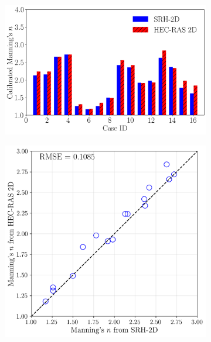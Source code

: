 \documentclass[preview, border=2pt]{standalone}
\begin{document}
\begin{figure}
     \centering
     \begin{subfigure}[c]{0.45\textwidth}
         \centering
         \caption{}
         \includegraphics[width=\textwidth]{ManningN_comparison_SRH_RAS.png}
     \end{subfigure}
     \hfill     
     \begin{subfigure}[c]{0.45\textwidth}
         \centering
         \caption{}
         \includegraphics[width=\textwidth]{ManningN_comparison_SRH_RAS_scatter.png}
     \end{subfigure}
     \hfill     

\end{figure}
\end{document}
